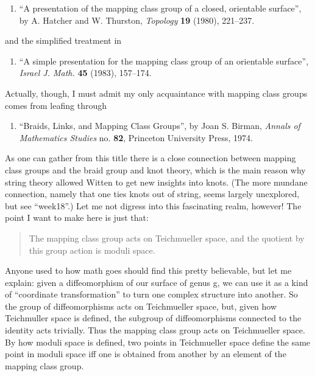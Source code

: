 \documentclass{article}
\def\tightlist{}
\begin{document}
\begin{enumerate}
\def\labelenumi{\arabic{enumi})}
\setcounter{enumi}{3}
\tightlist
\item
  ``A presentation of the mapping class group of a closed, orientable
  surface'', by A. Hatcher and W. Thurston, \emph{Topology} \textbf{19}
  (1980), 221--237.
\end{enumerate}

and the simplified treatment in

\begin{enumerate}
\def\labelenumi{\arabic{enumi})}
\setcounter{enumi}{4}
\tightlist
\item
  ``A simple presentation for the mapping class group of an orientable
  surface'', \emph{Israel J. Math.} \textbf{45} (1983), 157--174.
\end{enumerate}

Actually, though, I must admit my only acquaintance with mapping class
groups comes from leafing through

\begin{enumerate}
\def\labelenumi{\arabic{enumi})}
\setcounter{enumi}{5}
\tightlist
\item
  ``Braids, Links, and Mapping Class Groups'', by Joan S. Birman,
  \emph{Annals of Mathematics Studies} no. \textbf{82}, Princeton
  University Press, 1974.
\end{enumerate}

As one can gather from this title there is a close connection between
mapping class groups and the braid group and knot theory, which is the
main reason why string theory allowed Witten to get new insights into
knots. (The more mundane connection, namely that one ties knots out of
string, seems largely unexplored, but see ``week18''.) Let me not
digress into this fascinating realm, however! The point I want to make
here is just that:

\begin{quote}
The mapping class group acts on Teichmueller space, and the quotient by
this group action is moduli space.
\end{quote}

Anyone used to how math goes should find this pretty believable, but let
me explain: given a diffeomorphism of our surface of genus g, we can use
it as a kind of ``coordinate transformation'' to turn one complex
structure into another. So the group of diffeomorphisms acts on
Teichmueller space, but, given how Teichmuller space is defined, the
subgroup of diffeomorphisms connected to the identity acts trivially.
Thus the mapping class group acts on Teichmueller space. By how moduli
space is defined, two points in Teichmueller space define the same point
in moduli space iff one is obtained from another by an element of the
mapping class group.
\end{document}
